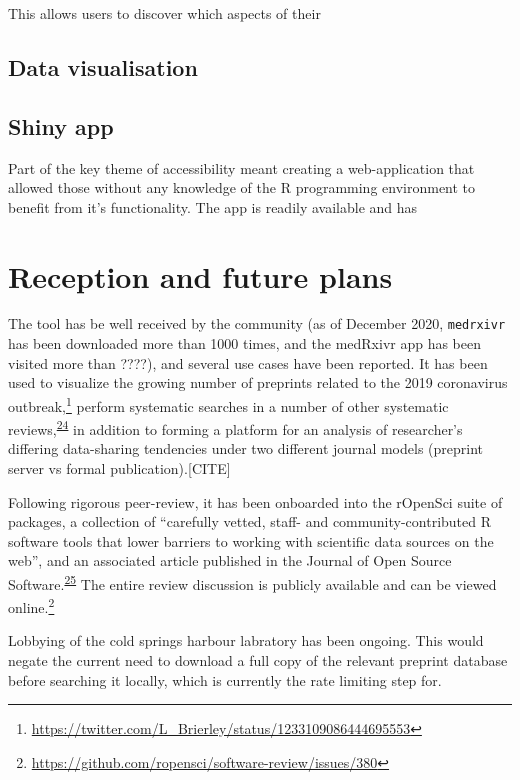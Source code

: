 \documentclass[a4paper, twoside]{templates/ociamthesis}
\begin{document}
This allows users to discover which aspects of their

\hypertarget{data-visualisation}{%
\subsection{Data visualisation}\label{data-visualisation}}

\hypertarget{shiny-app}{%
\subsection{Shiny app}\label{shiny-app}}

Part of the key theme of accessibility meant creating a web-application that allowed those without any knowledge of the R programming environment to benefit from it's functionality.
The app is readily available and has

\hypertarget{reception-and-future-plans}{%
\section{Reception and future plans}\label{reception-and-future-plans}}

The tool has be well received by the community (as of December 2020, \texttt{medrxivr} has been downloaded more than 1000 times, and the medRxivr app has been visited more than ????), and several use cases have been reported. It has been used to visualize the growing number of preprints related to the 2019 coronavirus outbreak,\footnote{\url{https://twitter.com/L_Brierley/status/1233109086444695553}} perform systematic searches in a number of other systematic reviews,\textsuperscript{\protect\hyperlink{ref-noone2020}{24}} in addition to forming a platform for an analysis of researcher's differing data-sharing tendencies under two different journal models (preprint server vs formal publication).{[}CITE{]}

Following rigorous peer-review, it has been onboarded into the rOpenSci suite of packages, a collection of ``carefully vetted, staff- and community-contributed R software tools that lower barriers to working with scientific data sources on the web'', and an associated article published in the Journal of Open Source Software.\textsuperscript{\protect\hyperlink{ref-mcguinness2020a}{25}} The entire review discussion is publicly available and can be viewed online.\footnote{\url{https://github.com/ropensci/software-review/issues/380}}

Lobbying of the cold springs harbour labratory has been ongoing. This would negate the current need to download a full copy of the relevant preprint database before searching it locally, which is currently the rate limiting step for.
\end{document}
